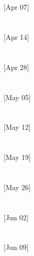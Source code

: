 \documentclass{llncs}
\begin{document}
\section{}
[Apr 07]

\section{}
[Apr 14]

\section{}
[Apr 28]

\section{}
[May 05]

\section{}
[May 12]

\section{}
[May 19]

\section{}
[May 26]

\section{}
[Jun 02]

\section{}
[Jun 09]


\printbibliography %
\end{document}
